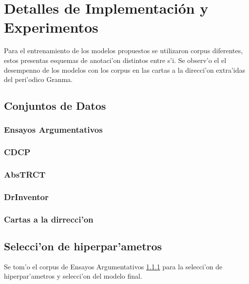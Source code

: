 \chapter{Detalles de Implementación y Experimentos}\label{chapter:implementation}


Para el entrenamiento de los modelos propuestos se utilizaron corpus diferentes, estos
presentas esquemas de anotaci'on distintos entre s'i. Se observ'o el el desempenno
de los modelos con los corpus en las cartas a la direcci'on extra'idas del peri'odico Granma.

\section{Conjuntos de Datos}

\subsection{Ensayos Argumentativos}\label{corpus:persuasive_essays}

\subsection{CDCP}

\subsection{AbsTRCT}

\subsection{DrInventor}

\subsection{Cartas a la dirrecci'on}


\section{Selecci'on de hiperpar'ametros}

Se tom'o el corpus de Ensayos Argumentativos \ref{corpus:persuasive_essays} para la selecci'on 
de hiperpar'ametros y selecci'on del modelo final.  